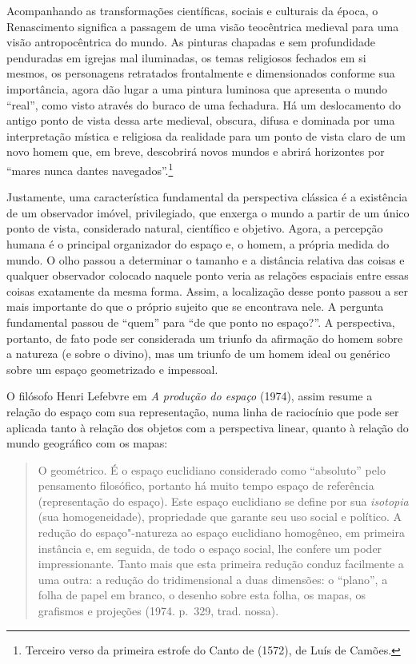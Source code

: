 Acompanhando as transformações científicas, sociais e culturais da
época, o Renascimento significa a passagem de uma visão teocêntrica
medieval para uma visão antropocêntrica do mundo. As pinturas chapadas e
sem profundidade penduradas em igrejas mal iluminadas, os temas
religiosos fechados em si mesmos, os personagens retratados frontalmente
e dimensionados conforme sua importância, agora dão lugar a uma pintura
luminosa que apresenta o mundo ``real'', como visto através do buraco de
uma fechadura. Há um deslocamento do antigo ponto de vista dessa arte
medieval, obscura, difusa e dominada por uma interpretação mística e
religiosa da realidade para um ponto de vista claro de um novo homem
que, em breve, descobrirá novos mundos e abrirá horizontes por ``mares
nunca dantes navegados''.\footnote{Terceiro verso da primeira estrofe
  do Canto  de {} (1572), de Luís de Camões.}

Justamente, uma característica fundamental da perspectiva clássica é a
existência de um observador imóvel, privilegiado, que enxerga o mundo a
partir de um único ponto de vista, considerado natural, científico e
objetivo. Agora, a percepção humana é o principal organizador do espaço
e, o homem, a própria medida do mundo. O olho passou a determinar o
tamanho e a distância relativa das coisas e qualquer observador colocado
naquele ponto veria as relações espaciais entre essas coisas exatamente
da mesma forma. Assim, a localização desse ponto passou a ser mais
importante do que o próprio sujeito que se encontrava nele. A pergunta
fundamental passou de ``quem'' para ``de que ponto no espaço?''. A
perspectiva, portanto, de fato pode ser considerada um triunfo da
afirmação do homem sobre a natureza (e sobre o divino), mas um triunfo
de um homem ideal ou genérico sobre um espaço geometrizado e impessoal.

O filósofo Henri Lefebvre em \emph{A produção do espaço} (1974), assim
resume a relação do espaço com sua representação, numa linha de
raciocínio que pode ser aplicada tanto à relação dos objetos com a
perspectiva linear, quanto à relação do mundo geográfico com os mapas:

\begin{quote}
O geométrico. É o espaço euclidiano considerado como ``absoluto'' pelo
pensamento filosófico, portanto há muito tempo espaço de referência %
(representação do espaço). Este espaço euclidiano se define por sua
\emph{isotopia} (sua homogeneidade), propriedade que garante seu uso
social e político. A redução do espaço"-natureza ao espaço euclidiano
homogêneo, em primeira instância e, em seguida, de todo o espaço social,
lhe confere um poder impressionante. Tanto mais que esta primeira
redução conduz facilmente a uma outra: a redução do tridimensional a
duas dimensões: o ``plano'', a folha de papel em branco, o desenho sobre %
esta folha, os mapas, os grafismos e projeções (1974. p.~329, trad.
nossa).
\end{quote}

